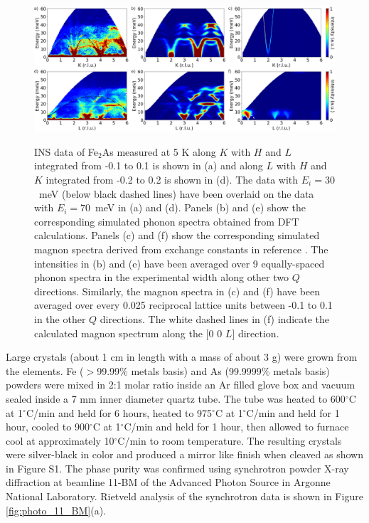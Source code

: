 \documentclass[10pt,doublespacing,edeposit]{uiucthesis2020}
\begin{document}
\begin{mainmatter}
\begin{figure}
\end{figure}


\begin{figure}
\centering\includegraphics[width=\columnwidth]{figures/ch8/phonon_spectra_magnon_spectra_combined.png} \\
\caption{\label{fig:phonon_magnon_spectra}
INS data of Fe$_2$As measured at 5 K along $K$ with $H$ and $L$ integrated from -0.1 to 0.1 is shown in (a) and along $L$ with $H$ and $K$ integrated from -0.2 to 0.2 is shown in (d). The data with $E_i = 30$~meV (below black dashed lines) have been overlaid on the data with $E_i = 70$~meV in (a) and (d). Panels (b) and (e) show the corresponding simulated phonon spectra obtained from DFT calculations. Panels (c) and (f) show the corresponding simulated magnon spectra derived from exchange constants in reference . The intensities in (b) and (e) have been averaged over 9 equally-spaced phonon spectra in the experimental width along other two $Q$ directions. Similarly, the magnon spectra in (c) and (f) have been averaged over every 0.025 reciprocal lattice units between -0.1 to 0.1 in the other $Q$ directions. The white dashed lines in (f) indicate the calculated magnon spectrum along the [0 0 $L$] direction.
}
\end{figure}


Large crystals (about 1 cm in length with a mass of about 3 g) were grown from the elements. 
Fe ($>$99.99\% metals basis) and As (99.9999\% metals basis) powders were mixed in 2:1 molar ratio inside an Ar filled glove box and vacuum sealed inside a 7 mm inner diameter quartz tube.
The tube was heated to 600$^{\circ}$C at 1$^{\circ}$C/min and held for 6 hours, heated to 975$^{\circ}$C at 1$^{\circ}$C/min and held for 1 hour, cooled to 900$^{\circ}$C at 1$^{\circ}$C/min and held for 1 hour, then allowed to furnace cool at approximately 10$^{\circ}$C/min to room temperature. The resulting crystals were silver-black in color and produced a mirror like finish when cleaved as shown in Figure S1. The phase purity  was confirmed using synchrotron powder X-ray diffraction  at beamline 11-BM of the Advanced Photon Source in Argonne National Laboratory. Rietveld analysis of the synchrotron data is shown in Figure \ref{fig:photo_11_BM}(a).




\end{mainmatter}
\end{document}
